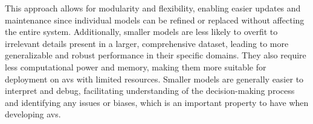This approach allows for modularity and flexibility, enabling easier updates and maintenance since individual models can be refined or replaced without affecting the entire system. Additionally, smaller models are less likely to overfit to irrelevant details present in a larger, comprehensive dataset, leading to more generalizable and robust performance in their specific domains. They also require less computational power and memory, making them more suitable for deployment on \gls{av}s with limited resources. Smaller models are generally easier to interpret and debug, facilitating understanding of the decision-making process and identifying any issues or biases, which is an important property to have when developing \gls{av}s.


